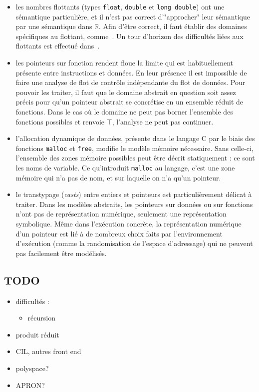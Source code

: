 \begin{itemize}
\item les nombres flottants
(types \texttt{float}, \texttt{double} et \texttt{long double}) ont une
sémantique particulière, et il n'est pas correct d'"approcher" leur sémantique
par une sémantique dans $ℝ$. Afin d'être correct, il faut établir des domaines
spécifiques au flottant, comme~\cite{floatpoly}. Un tour d'horizon des
difficultés liées aux flottants est effectué dans~\cite{floatpitfalls}.

\item les pointeurs sur fonction
rendent floue la limite qui est habituellement présente entre instructions et
données. En leur présence il est impossible de faire une analyse de flot de
contrôle indépendante du flot de données. Pour pouvoir les traiter, il faut que
le domaine abstrait en question soit assez précis pour qu'un pointeur abstrait
se concrétise en un ensemble réduit de fonctions. Dans le cas où le domaine ne
peut pas borner l'ensemble des fonctions possibles et renvoie $\top$, l'analyse
ne peut pas continuer.

\item l'allocation dynamique
de données, présente dans le langage C par le biais des fonctions
\texttt{malloc} et \texttt{free}, modifie le modèle mémoire
nécessaire. Sans celle-ci, l'ensemble des zones mémoire possibles peut être
décrit statiquement : ce sont les noms de variable. Ce qu'introduit
\texttt{malloc} au langage, c'est une zone mémoire qui n'a pas de nom, et sur
laquelle on n'a qu'un pointeur.


\item le transtypage (\emph{casts}) entre entiers et pointeurs
est particulièrement délicat à traiter. Dans les modèles abstraits, les
pointeurs sur données ou sur fonctions n'ont pas de représentation numérique,
seulement une représentation symbolique. Même dans l'exécution concrète, la
représentation numérique d'un pointeur est lié à de nombreux choix faits par
l'environnement d'exécution (comme la randomisation de l'espace d'adressage) qui
ne peuvent pas facilement être modélisés.

\end{itemize}

\subsection*{TODO}

\begin{itemize}
\item difficultés :

\begin{itemize}
\item
  récursion
\end{itemize}

\item produit réduit
\item CIL, autres front end
\item polyspace?
\item APRON?
\end{itemize}


